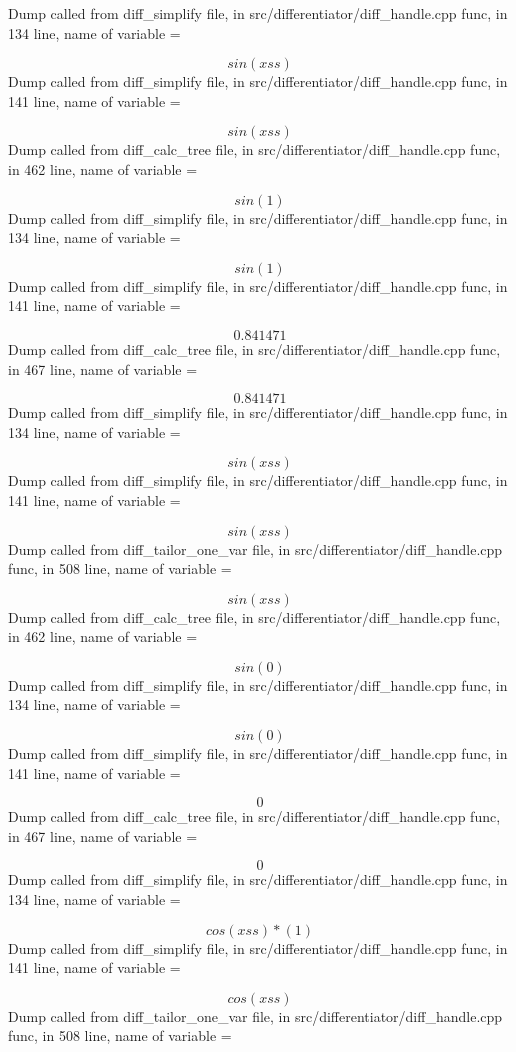 \documentclass{article}
\begin{document}
Dump called from diff_simplify file, in src/differentiator/diff_handle.cpp func, in 134 line, name of variable = 


$$
 sin (xss)
$$
Dump called from diff_simplify file, in src/differentiator/diff_handle.cpp func, in 141 line, name of variable = 


$$
 sin (xss)
$$
Dump called from diff_calc_tree file, in src/differentiator/diff_handle.cpp func, in 462 line, name of variable = 


$$
 sin (1)
$$
Dump called from diff_simplify file, in src/differentiator/diff_handle.cpp func, in 134 line, name of variable = 


$$
 sin (1)
$$
Dump called from diff_simplify file, in src/differentiator/diff_handle.cpp func, in 141 line, name of variable = 


$$
0.841471
$$
Dump called from diff_calc_tree file, in src/differentiator/diff_handle.cpp func, in 467 line, name of variable = 


$$
0.841471
$$
Dump called from diff_simplify file, in src/differentiator/diff_handle.cpp func, in 134 line, name of variable = 


$$
 sin (xss)
$$
Dump called from diff_simplify file, in src/differentiator/diff_handle.cpp func, in 141 line, name of variable = 


$$
 sin (xss)
$$
Dump called from diff_tailor_one_var file, in src/differentiator/diff_handle.cpp func, in 508 line, name of variable = 


$$
 sin (xss)
$$
Dump called from diff_calc_tree file, in src/differentiator/diff_handle.cpp func, in 462 line, name of variable = 


$$
 sin (0)
$$
Dump called from diff_simplify file, in src/differentiator/diff_handle.cpp func, in 134 line, name of variable = 


$$
 sin (0)
$$
Dump called from diff_simplify file, in src/differentiator/diff_handle.cpp func, in 141 line, name of variable = 


$$
0
$$
Dump called from diff_calc_tree file, in src/differentiator/diff_handle.cpp func, in 467 line, name of variable = 


$$
0
$$
Dump called from diff_simplify file, in src/differentiator/diff_handle.cpp func, in 134 line, name of variable = 


$$
 cos (xss) * (1)
$$
Dump called from diff_simplify file, in src/differentiator/diff_handle.cpp func, in 141 line, name of variable = 


$$
 cos (xss)
$$
Dump called from diff_tailor_one_var file, in src/differentiator/diff_handle.cpp func, in 508 line, name of variable = 
\end{document}
